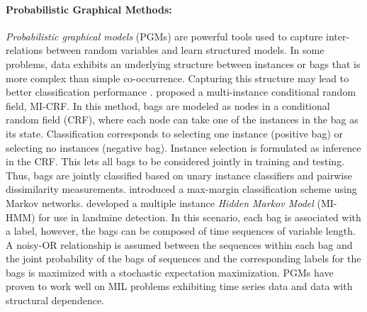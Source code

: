 \paragraph{Probabilistic Graphical Methods:}
\textit{Probabilistic graphical models} (PGMs) are powerful tools used to capture inter-relations between random variables and learn structured models. In some problems, data exhibits an underlying structure between instances or bags that is more complex than simple co-occurrence.  Capturing this structure may lead to better classification performance \citep{Carbonneau2016MILSurvey}.  \cite{Deselaers2010MICRF} proposed a multi-instance conditional random field, MI-CRF.  In this method, bags are modeled as nodes in a conditional random field (CRF), where each node can take one of the instances in the bag as its state.  Classification corresponds to selecting one instance (positive bag) or selecting no instances (negative bag).  Instance selection is formulated as inference in the CRF.  This lets all bags to be considered jointly in training and testing.  Thus, bags are jointly classified based on unary instance classifiers and pairwise dissimilarity measurements.  \cite{Hajimirsadeghi2017MIClassificationMarkovNetworks} introduced a max-margin classification scheme using Markov networks.  \cite{Yuksel2015MIHMMLandmine,Yuksel2015MIHMMLandmine2} developed a multiple instance \textit{Hidden Markov Model} (MI-HMM) for use in landmine detection.  In this scenario, each bag is associated with a label, however, the bags can be composed of time sequences of variable length.  A noisy-OR relationship is assumed between the sequences within each bag and the joint probability of the bags of sequences and the corresponding labels for the bags is maximized with a stochastic expectation maximization.  PGMs have proven to work well on MIL problems exhibiting time series data and data with structural dependence.

